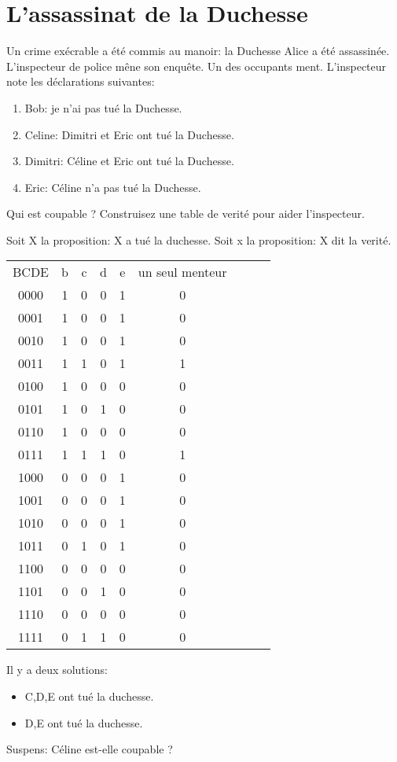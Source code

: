 \documentclass[a4paper,10pt]{exam}
\begin{document}
\pagebreak
\section{L'assassinat de la Duchesse}
Un crime exécrable a été commis au manoir: la Duchesse Alice a été assassinée.
L'inspecteur de police mêne son enquête.  Un des occupants ment.
L'inspecteur note les déclarations suivantes:
\begin{enumerate}
  \item Bob: je n'ai pas tué la Duchesse.
  \item Celine: Dimitri et Eric ont tué la Duchesse.
  \item Dimitri: Céline et Eric ont tué la Duchesse.
  \item Eric: Céline n'a pas tué la Duchesse.
\end{enumerate}
Qui est coupable ?
Construisez une table de verité pour aider l'inspecteur.

\begin{solution}
  Soit X la proposition: \og X a tué la duchesse\fg{}.
  Soit x la proposition: \og X dit la verité\fg{}.

  \begin{tabular}{ccccccccc}
    BCDE&b&c&d&e&un seul menteur\\
    0000&1&0&0&1&0\\
    0001&1&0&0&1&0\\
    0010&1&0&0&1&0\\
    0011&1&1&0&1&1\\
    0100&1&0&0&0&0\\
    0101&1&0&1&0&0\\
    0110&1&0&0&0&0\\
    0111&1&1&1&0&1\\
    1000&0&0&0&1&0\\
    1001&0&0&0&1&0\\
    1010&0&0&0&1&0\\
    1011&0&1&0&1&0\\
    1100&0&0&0&0&0\\
    1101&0&0&1&0&0\\
    1110&0&0&0&0&0\\
    1111&0&1&1&0&0\\
  \end{tabular}

  Il y a deux solutions:
  \begin{itemize}
    \item C,D,E ont tué la duchesse.
    \item D,E ont tué la duchesse.
  \end{itemize}

  Suspens: Céline est-elle coupable ?
\end{solution}
\end{document}
